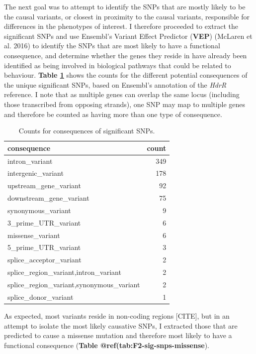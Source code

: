 \documentclass[
]{book}
\begin{document}
The next goal was to attempt to identify the SNPs that are mostly likely to be the causal variants, or closest in proximity to the causal variants, responsible for differences in the phenotypes of interest. I therefore proceeded to extract the significant SNPs and use Ensembl's Variant Effect Predictor (\textbf{VEP}) (McLaren et al. 2016) to identify the SNPs that are most likely to have a functional consequence, and determine whether the genes they reside in have already been identified as being involved in biological pathways that could be related to behaviour. \textbf{Table \ref{tab:F2-sig-snps-consq-counts}} shows the counts for the different potential consequences of the unique significant SNPs, based on Ensembl's annotation of the \emph{HdrR} reference. I note that as multiple genes can overlap the same locus (including those transcribed from opposing strands), one SNP may map to multiple genes and therefore be counted as having more than one type of consequence.

\begin{table}

\caption{\label{tab:F2-sig-snps-consq-counts}Counts for consequences of significant SNPs.}
\centering
\begin{tabular}[t]{l|r}
\hline
consequence & count\\
\hline
intron\_variant & 349\\
\hline
intergenic\_variant & 178\\
\hline
upstream\_gene\_variant & 92\\
\hline
downstream\_gene\_variant & 75\\
\hline
synonymous\_variant & 9\\
\hline
3\_prime\_UTR\_variant & 6\\
\hline
missense\_variant & 6\\
\hline
5\_prime\_UTR\_variant & 3\\
\hline
splice\_acceptor\_variant & 2\\
\hline
splice\_region\_variant,intron\_variant & 2\\
\hline
splice\_region\_variant,synonymous\_variant & 2\\
\hline
splice\_donor\_variant & 1\\
\hline
\end{tabular}
\end{table}

As expected, most variants reside in non-coding regions {[}CITE{]}, but in an attempt to isolate the most likely causative SNPs, I extracted those that are predicted to cause a missense mutation and therefore most likely to have a functional consequence (\textbf{Table @ref(tab:F2-sig-snps-missense}).
\end{document}
